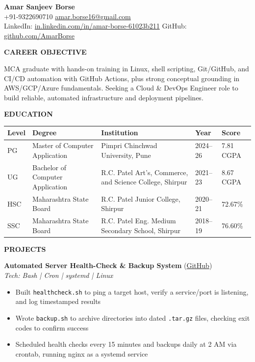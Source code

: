 \documentclass[12pt]{extarticle}
\newcommand{\sectiontitle}[1]{%
  \vspace{0.08em}
  \noindent\colorbox{sectiongray}{\parbox{\dimexpr\textwidth-2\fboxsep}{\textbf{#1}}}
  \vspace{0.05em}
}
\begin{document}
\begin{center}
    {\LARGE \textbf{Amar Sanjeev Borse}}\\[3pt]
    +91-9322690710 \;  \; \href{mailto:amar.borse16@gmail.com}{amar.borse16@gmail.com}\\[2pt]
    LinkedIn: \href{https://in.linkedin.com/in/amar-borse-61023b211}{in.linkedin.com/in/amar-borse-61023b211} \; \; GitHub: \href{https://github.com/AmarBorse}{github.com/AmarBorse}\\[2pt]
\end{center}

\sectiontitle{CAREER OBJECTIVE}

MCA graduate with hands-on training in Linux, shell scripting, Git/GitHub, and CI/CD automation with GitHub Actions, plus strong conceptual grounding in AWS/GCP/Azure fundamentals. Seeking a Cloud \& DevOps Engineer role to build reliable, automated infrastructure and deployment pipelines.

\sectiontitle{EDUCATION}

\setlength{\tabcolsep}{4pt}
\renewcommand{\arraystretch}{0.85}
\begin{tabular}{|p{0.4in}|p{2.0in}|p{2.5in}|p{0.6in}|p{0.65in}|}
    \hline
    \textbf{Level} & \textbf{Degree} & \textbf{Institution} & \textbf{Year} & \textbf{Score} \\
    \hline
    PG & Master of Computer Application & Pimpri Chinchwad University, Pune & 2024--26 & 7.81 CGPA \\
    \hline
    UG & Bachelor of Computer Application & R.C. Patel Art's, Commerce, and Science College, Shirpur & 2021--23 & 8.67 CGPA \\
    \hline
    HSC & Maharashtra State Board & R.C. Patel Junior College, Shirpur & 2020--21 & 72.67\% \\
    \hline
    SSC & Maharashtra State Board & R.C. Patel Eng. Medium Secondary School, Shirpur & 2018--19 & 76.60\% \\
    \hline
\end{tabular}

\sectiontitle{PROJECTS}

\textbf{Automated Server Health-Check \& Backup System} (\href{https://github.com/AmarBorse}{GitHub})\\
\textit{Tech: Bash | Cron | systemd | Linux}
\begin{itemize}
    \item Built \texttt{healthcheck.sh} to ping a target host, verify a service/port is listening, and log timestamped results
    \item Wrote \texttt{backup.sh} to archive directories into dated \texttt{.tar.gz} files, checking exit codes to confirm success
    \item Scheduled health checks every 15 minutes and backups daily at 2 AM via crontab, running nginx as a systemd service
\end{itemize}
\end{document}
